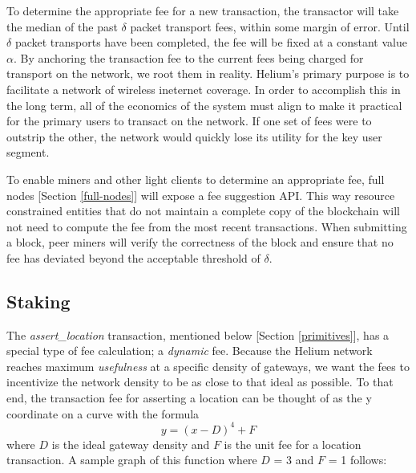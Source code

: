 \documentclass[10pt, nonatbib, nocopyrightspace, reprint]{sigplanconf}
\begin{document}
To determine the appropriate fee for a new transaction, the transactor will take the median of the past $\delta$ packet transport fees, within some margin of error. Until $\delta$ packet transports have been completed, the fee will be fixed at a constant value $\alpha$. By anchoring the transaction fee to the current fees being charged for transport on the network, we root them in reality. Helium's primary purpose is to facilitate a network of wireless ineternet coverage. In order to accomplish this in the long term, all of the economics of the system must align to make it practical for the primary users to transact on the network. If one set of fees were to outstrip the other, the network would quickly lose its utility for the key user segment.

To enable miners and other light clients to determine an appropriate fee, full nodes [Section \ref{full-nodes}] will expose a fee suggestion API. This way resource constrained entities that do not maintain a complete copy of the blockchain will not need to compute the fee from the most recent transactions. When submitting a block, peer miners will verify the correctness of the block and ensure that no fee has deviated beyond the acceptable threshold of $\delta$.

\subsection{Staking} \label{staking}

The \emph{assert\_location} transaction, mentioned below [Section \ref{primitives}], has a special type of fee calculation; a \emph{dynamic} fee. Because the Helium network reaches maximum \emph{usefulness} at a specific density of gateways, we want the fees to incentivize the network density to be as close to that ideal as possible. To that end, the transaction fee for asserting a location can be thought of as the y coordinate on a curve with the formula \[\mathit{y = \left(x - D\right)^4 + F}\] where $D$ is the ideal gateway density and $F$ is the unit fee for a location transaction. A sample graph of this function where $D$ = 3 and $F$ = 1 follows:

\pgfplotsset{width=12cm,compat=1.9}
\end{document}
